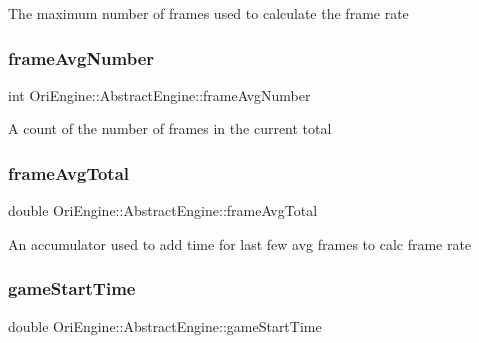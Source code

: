 The maximum number of frames used to calculate the frame rate \hypertarget{class_ori_engine_1_1_abstract_engine_a878214e5c90997da1b783cd14eb19c6e}{}\label{class_ori_engine_1_1_abstract_engine_a878214e5c90997da1b783cd14eb19c6e} 
\subsubsection{\texorpdfstring{frame\+Avg\+Number}{frameAvgNumber}}
{\footnotesize\ttfamily int Ori\+Engine\+::\+Abstract\+Engine\+::frame\+Avg\+Number\hspace{0.3cm}{\ttfamily [private]}}

A count of the number of frames in the current total \hypertarget{class_ori_engine_1_1_abstract_engine_a98601d59527aa41d264c07ec6cfb3fde}{}\label{class_ori_engine_1_1_abstract_engine_a98601d59527aa41d264c07ec6cfb3fde} 
\subsubsection{\texorpdfstring{frame\+Avg\+Total}{frameAvgTotal}}
{\footnotesize\ttfamily double Ori\+Engine\+::\+Abstract\+Engine\+::frame\+Avg\+Total\hspace{0.3cm}{\ttfamily [private]}}

An accumulator used to add time for last few avg frames to calc frame rate \hypertarget{class_ori_engine_1_1_abstract_engine_a34aa336df066d8c50363cf6260fcd268}{}\label{class_ori_engine_1_1_abstract_engine_a34aa336df066d8c50363cf6260fcd268} 
\subsubsection{\texorpdfstring{game\+Start\+Time}{gameStartTime}}
{\footnotesize\ttfamily double Ori\+Engine\+::\+Abstract\+Engine\+::game\+Start\+Time\hspace{0.3cm}{\ttfamily [private]}}

